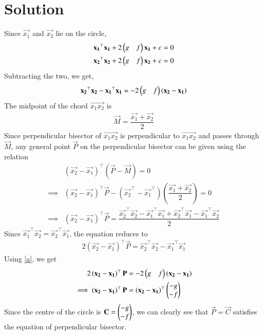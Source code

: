 \documentclass[journal,12pt,twocolumn]{IEEEtran}
\begin{document}
\section{Solution}
Since $\vec{x_1}$ and $\vec{x_2}$ lie on the circle,
\begin{align}
       \mathbf{x_1}^\top\mathbf{x_1}+2\begin{pmatrix}g&f\end{pmatrix}\mathbf{x_1}+c=0\\
       \mathbf{x_2}^\top\mathbf{x_2}+2\begin{pmatrix}g&f\end{pmatrix}\mathbf{x_2}+c=0
\end{align}
Subtracting the two, we get,
\begin{align}
    \mathbf{x_2}^\top\mathbf{x_2}-\mathbf{x_1}^\top\mathbf{x_1}=-2\begin{pmatrix}g&f\end{pmatrix}(\mathbf{x_2}-\mathbf{x_1}) \label{a}
\end{align}
The midpoint of the chord $\vec{x_1x_2}$ is 
\begin{align}
    \vec{M}=\dfrac{\vec{x_1}+\vec{x_2}}{2}
\end{align}
Since perpendicular bisector of $\vec{x_1x_2}$ is perpendicular to $\vec{x_1x_2}$ and passes through $\vec{M}$, any general point $\vec{P}$ on the perpendicular bisector can be given using the relation
\begin{align}
    &\left(\vec{x_2}-\vec{x_1}\right)^\top\left(\vec{P}-\vec{M}\right)=0\\
    \implies &\left(\vec{x_2}-\vec{x_1}\right)^\top\vec{P}-\left(\vec{x_2}^\top-\vec{x_1}^\top\right)\left(\dfrac{\vec{x_1}+\vec{x_2}}{2}\right)=0\\
    \implies &\left(\vec{x_2}-\vec{x_1}\right)^\top\vec{P}=\dfrac{\vec{x_2}^\top\vec{x_2}-\vec{x_1}^\top\vec{x_1}+\vec{x_2}^\top\vec{x_1}-\vec{x_1}^\top\vec{x_2}}{2}
\end{align}
Since $\vec{x_1}^\top\vec{x_2}=\vec{x_2}^\top\vec{x_1}$, the equation reduces to
\begin{align}
    2\left(\vec{x_2}-\vec{x_1}\right)^\top\vec{P}=\vec{x_2}^\top\vec{x_2}-\vec{x_1}^\top\vec{x_1}
\end{align}
Using \eqref{a}, we get
\begin{align}
    2\left(\mathbf{x_2}-\mathbf{x_1}\right)^\top\mathbf{P}&=-2\begin{pmatrix}g&f\end{pmatrix}(\mathbf{x_2}-\mathbf{x_1})\\
    \implies \left(\mathbf{x_2}-\mathbf{x_1}\right)^\top\mathbf{P}&=\left(\mathbf{x_2}-\mathbf{x_1}\right)^\top\begin{pmatrix}-g\\-f\end{pmatrix}
\end{align}
Since the centre of the circle is $\mathbf{C}=\begin{pmatrix}-g\\-f\end{pmatrix}$, we can clearly see that $\vec{P}=\vec{C}$ satisfies the equation of perpendicular bisector.\\
\end{document}
